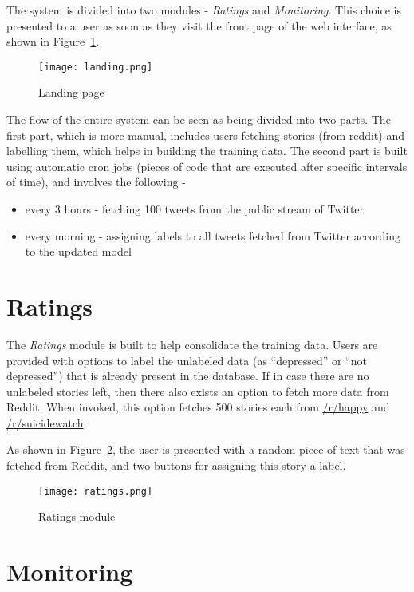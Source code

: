 The system is divided into two modules - \emph{Ratings} and \emph{Monitoring}. This choice is presented to a user as soon as they visit the front page of the web interface, as shown in Figure~\ref{landing}.
\begin{figure}
    \centering
        \texttt{[image: landing.png]}
    \caption{Landing page} \label{landing}
\end{figure}

The flow of the entire system can be seen as being divided into two parts. The first part, which is more manual, includes users fetching stories (from reddit) and labelling them, which helps in building the training data. The second part is built using automatic cron jobs (pieces of code that are executed after specific intervals of time), and involves the following -
\begin{itemize}
    \item{every 3 hours - fetching 100 tweets from the public stream of Twitter}
    \item{every morning - assigning labels to all tweets fetched from Twitter according to the updated model}
\end{itemize}

\section{Ratings}
The \emph{Ratings} module is built to help consolidate the training data. Users are provided with options to label the unlabeled data (as ``depressed'' or ``not depressed'') that is already present in the database. If in case there are no unlabeled stories left, then there also exists an option to fetch more data from Reddit. When invoked, this option fetches 500 stories each from \href{http://www.reddit.com/r/happy}{/r/happy} and \href{http://www.reddit.com/r/suicidewatch}{/r/suicidewatch}.

As shown in Figure~\ref{ratings}, the user is presented with a random piece of text that was fetched from Reddit, and two buttons for assigning this story a label.

\begin{figure}
    \centering
        \texttt{[image: ratings.png]}
    \caption{Ratings module} \label{ratings}
\end{figure}

\section{Monitoring}
